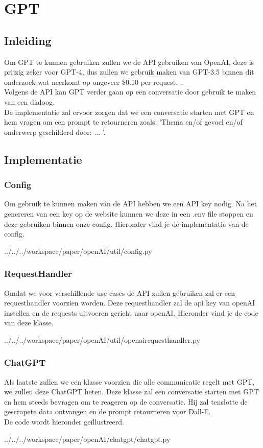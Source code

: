 \section{GPT}
\subsection{Inleiding}
Om GPT te kunnen gebruiken zullen we de API gebruiken van OpenAI, deze is prijzig zeker voor GPT-4, dus zullen we gebruik maken van GPT-3.5 binnen dit onderzoek wat neerkomt op ongeveer \$0.10 per request.  \autocite{gpt_pricing}. \\

Volgens de API kan GPT verder gaan op een conversatie door gebruik te maken van een dialoog.  \\

De implementatie zal ervoor zorgen dat we een conversatie starten met GPT en hem vragen om een prompt te retourneren zoals: 'Thema en/of gevoel en/of onderwerp geschilderd door: ... '.  

\subsection{Implementatie}
\subsubsection{Config}
Om gebruik te kunnen maken van de API hebben we een API key nodig. Na het genereren van een key op de website kunnen we deze in een .env file stoppen en deze gebruiken binnen onze config. Hieronder vind je de implementatie van de config. 
\begin{pythoncode}{../../../workspace/paper/openAI/util/config.py}
\end{pythoncode}

\subsubsection{RequestHandler}
Omdat we voor verschillende use-cases de API zullen gebruiken zal er een requesthandler voorzien worden. Deze requesthandler zal de api key van openAI instellen en de requests uitvoeren gericht naar openAI. Hieronder vind je de code van deze klasse. 
\begin{pythoncode}{../../../workspace/paper/openAI/util/openairequesthandler.py}
\end{pythoncode}

\subsubsection{ChatGPT}
Als laatste zullen we een klasse voorzien die alle communicatie regelt met GPT, we zullen deze ChatGPT heten. Deze klasse zal een conversatie starten met GPT en hem steeds bevragen om te reageren op de conversatie. Hij zal tenslotte de gescrapete data ontvangen en de prompt retourneren voor Dall-E. \\
De code wordt hieronder geïllustreerd. 
\begin{pythoncode}{../../../workspace/paper/openAI/chatgpt/chatgpt.py}
\end{pythoncode}

